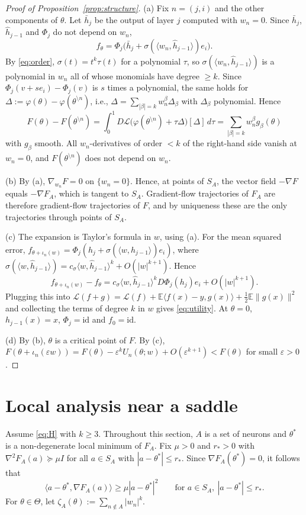 \documentclass[11pt]{article}
\theoremstyle{definition}
\theoremstyle{remark}
\numberwithin{equation}{section}
\newcommand{\E}{\mathbb{E}}
\newcommand{\cL}{\mathcal{L}}
\newcommand{\eps}{\varepsilon}
\newcommand{\sm}{\setminus}
\newcommand{\ip}[2]{\langle #1,#2\rangle}
\newcommand{\id}{\mathrm{id}}
\begin{document}
\begin{proof}[Proof of Proposition~\ref{prop:structure}]
(a) Fix $n=(j,i)$ and the other components of $\theta$. Let $\bar h_j$ be the output of layer $j$ computed with $w_n=0$. Since $\bar h_j$, $\hat h_{j-1}$ and $\Phi_j$ do not depend on $w_n$,
\[
f_\theta=\Phi_j\big(\bar h_j+\sigma(\ip{w_n}{\hat h_{j-1}})e_i\big).
\]
By \eqref{eq:order}, $\sigma(t)=t^k\tau(t)$ for a polynomial $\tau$, so $\sigma(\ip{w_n}{\hat h_{j-1}})$ is a polynomial in $w_n$ all of whose monomials have degree $\ge k$. Since $\Phi_j(v+se_i)-\Phi_j(v)$ is $s$ times a polynomial, the same holds for $\Delta:=\varphi(\theta)-\varphi(\theta^{\sm n})$, i.e., $\Delta=\sum_{|\beta|=k}w_n^\beta\Delta_\beta$ with $\Delta_\beta$ polynomial. Hence
\[
F(\theta)-F(\theta^{\sm n})=\int_0^1D\cL\big(\varphi(\theta^{\sm n})+\tau\Delta\big)[\Delta]\,d\tau=\sum_{|\beta|=k}w_n^\beta g_\beta(\theta)
\]
with $g_\beta$ smooth. All $w_n$-derivatives of order $<k$ of the right-hand side vanish at $w_n=0$, and $F(\theta^{\sm n})$ does not depend on $w_n$.

(b) By (a), $\nabla_{w_n}F=0$ on $\{w_n=0\}$. Hence, at points of $S_A$, the vector field $-\nabla F$ equals $-\nabla F_A$, which is tangent to $S_A$. Gradient-flow trajectories of $F_A$ are therefore gradient-flow trajectories of $F$, and by uniqueness these are the only trajectories through points of $S_A$.

(c) The expansion is Taylor's formula in $w$, using (a). For the mean squared error, $f_{\theta+\iota_n(w)}=\Phi_j(h_j+\sigma(\ip{w}{\hat h_{j-1}})e_i)$, where $\sigma(\ip{w}{\hat h_{j-1}})=c_\sigma\ip{w}{\hat h_{j-1}}^k+O(|w|^{k+1})$. Hence
\[
f_{\theta+\iota_n(w)}-f_\theta=c_\sigma\ip{w}{\hat h_{j-1}}^kD\Phi_j(h_j)e_i+O(|w|^{k+1}).
\]
Plugging this into $\cL(f+g)=\cL(f)+\E\ip{f(x)-y}{g(x)}+\frac12\E\|g(x)\|^2$ and collecting the terms of degree $k$ in $w$ gives \eqref{eq:utility}. At $\theta=0$, $h_{j-1}(x)=x$, $\Phi_j=\id$ and $f_0=\id$.

(d) By (b), $\theta$ is a critical point of $F$. By (c), $F(\theta+\iota_n(\eps w))=F(\theta)-\eps^kU_n(\theta;w)+O(\eps^{k+1})<F(\theta)$ for small $\eps>0$.
\end{proof}

\section{Local analysis near a saddle}\label{sec:local}

Assume \eqref{eq:H} with $k\ge3$. Throughout this section, $A$ is a set of neurons and $\theta^*$ is a non-degenerate local minimum of $F_A$. Fix $\mu>0$ and $r_*>0$ with $\nabla^2F_A(a)\succeq\mu I$ for all $a\in S_A$ with $|a-\theta^*|\le r_*$. Since $\nabla F_A(\theta^*)=0$, it follows that
\begin{equation}\label{eq:monotone}
\ip{a-\theta^*}{\nabla F_A(a)}\ge\mu|a-\theta^*|^2\qquad\text{for } a\in S_A,\ |a-\theta^*|\le r_*.
\end{equation}
For $\theta\in\Theta$, let $\zeta_A(\theta):=\sum_{n\notin A}|w_n|^k$.
\end{document}

